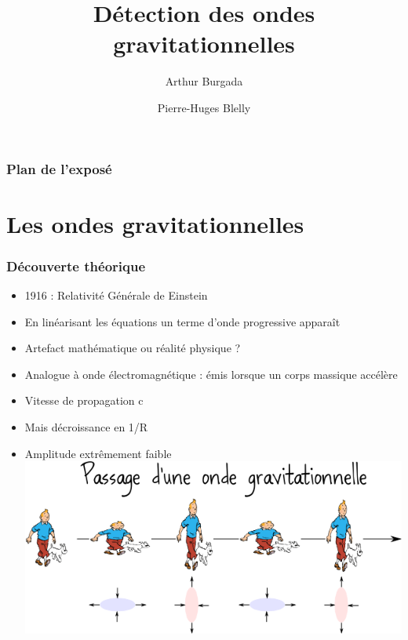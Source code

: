 \documentclass{beamer}
\date{}
\author{Arthur Burgada \and Pierre-Huges Blelly}
\title{Détection des ondes gravitationnelles}
\begin{document}
\begin{frame}
	\titlepage
\end{frame}

\begin{frame}
	\frametitle{Plan de l'exposé}
	\tableofcontents
\end{frame}

\section{Les ondes gravitationnelles}
\begin{frame}
	\frametitle{Découverte théorique}
	\begin{itemize}
		\item 1916 : Relativité Générale de Einstein
		\item En linéarisant les équations un terme d'onde progressive apparaît
		\item Artefact mathématique ou réalité physique ?
	\end{itemize}
\end{frame}

\begin{frame}
	\begin{itemize}
		\item Analogue à onde électromagnétique : émis lorsque un corps massique accélère
		\item Vitesse de propagation c
		\item Mais décroissance en 1/R
		\item Amplitude extrêmement faible
		\bigskip
		\center\includegraphics[scale = 0.4]{Docs/tintin.png}
	\end{itemize}

\end{frame}
\end{document}
